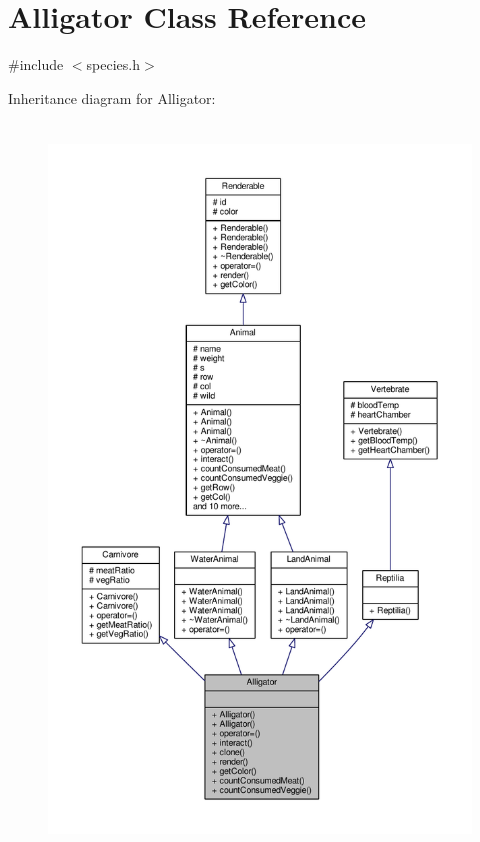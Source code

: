 \hypertarget{classAlligator}{}\section{Alligator Class Reference}
\label{classAlligator}


{\ttfamily \#include $<$species.\+h$>$}



Inheritance diagram for Alligator\+:
\nopagebreak
\begin{figure}[H]
\begin{center}
\leavevmode
\includegraphics[height=550pt]{classAlligator__inherit__graph}
\end{center}
\end{figure}


